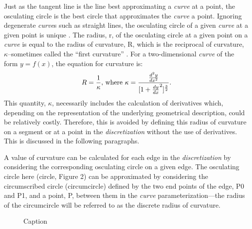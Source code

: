 \noindent Just as the tangent line is the line best approximating a \textit{curve} at a point, the osculating circle is the best circle that approximates the \textit{curve} a point. Ignoring degenerate \textit{curve}s such as straight lines, the osculating circle of a given \textit{curve} at a given point is unique \cite{gray97}. The radius, r, of the osculating circle at a given point on a \textit{curve} is equal to the radius of curvature, R, which is the reciprocal of curvature, $\kappa$--sometimes called the ``first curvature'' \cite{kreyszig91}. For a two-dimensional \textit{curve} of the form $y=f(x)$, the equation for curvature is:
\[ 
R=\frac{1}{\kappa} \textnormal{, where } 
\kappa=\frac{\frac{d^2y}{dx^2}}{[1+\frac{dy}{dx}^2 ]^\frac{3}{2}}. 
\]
\noindent This quantity, $\kappa$, necessarily includes the calculation of 
derivatives which, depending on the representation of the underlying geometrical description, could be relatively costly. Therefore, this is avoided by defining this radius of curvature on a segment or at a point in the \textit{discretization} without the use of derivatives. This is discussed in the following paragraphs.

A value of curvature can be calculated for each edge in the \textit{discretization} by considering the corresponding osculating circle on a given edge. The osculating circle here (circle, Figure 2) can be approximated by considering the circumscribed circle (circumcircle) \cite{casey1888} defined by the two end points of the edge, P0 and P1, and a point, P, between them in the \textit{curve} parameterization—the radius of the circumcircle will be referred to as the discrete radius of curvature.

\begin{figure}[h!]
  \caption{\label{CircumscribedCircle} Caption}
\end{figure}


